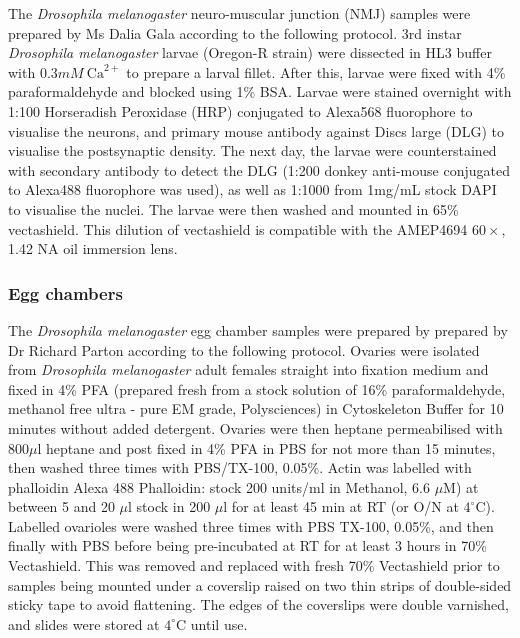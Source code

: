 The \textit{Drosophila melanogaster} neuro-muscular junction (NMJ) 
samples were prepared by Ms Dalia Gala according to the following protocol. 3rd instar \textit{Drosophila melanogaster} larvae (Oregon-R 
strain) were dissected in HL3 buffer with $0.3mM~\text{Ca}^{2+}$ to 
prepare a larval fillet. After this, larvae were fixed with 
4\% paraformaldehyde and blocked using 1\% BSA.\cite{brent2009drosophila} Larvae were stained overnight with 1:100 Horseradish Peroxidase (HRP) 
conjugated to Alexa568 fluorophore to visualise the neurons, and 
primary mouse antibody against Discs large (DLG) to visualise the 
postsynaptic density. The next day, the larvae were counterstained 
with secondary antibody to detect the DLG (1:200 donkey anti-mouse 
conjugated to Alexa488 fluorophore was used), as well as 1:1000 from 1mg/mL 
stock DAPI to visualise the nuclei. The larvae were then washed and mounted 
in 65\% vectashield\cite{brent2009drosophila}. This dilution of 
vectashield is compatible with the AMEP4694 $60\times$, 1.42 NA oil 
immersion lens.

\subsubsection{Egg chambers}
\label{subsubsec:Aurox_Egg_chambers_prep}


The \textit{Drosophila melanogaster} egg chamber samples were prepared by prepared by Dr Richard Parton according to the following protocol. Ovaries were isolated from \textit{Drosophila 
melanogaster} adult females straight into fixation medium and fixed in 4\% PFA 
(prepared fresh from a stock solution of 16\% paraformaldehyde, methanol free 
ultra - pure EM grade, Polysciences) in Cytoskeleton Buffer for 10 minutes 
without added 
detergent\cite{jia2016automatic,zhang2020nanoscale,leyton2016pfa}.  Ovaries 
were then heptane permeabilised with 800$\mu$l heptane and post fixed in 4\% 
PFA in PBS for not more than 15 minutes, then washed three times with 
PBS/TX-100, 0.05\%. Actin was labelled with phalloidin Alexa 488 Phalloidin: 
stock 200 units/ml in Methanol, 6.6 $\mu$M) at between 5 and 20 $\mu$l stock 
in 200 $\mu$l for at least 45 min at RT (or O/N at $4^{\circ}$C). Labelled 
ovarioles were washed three times with PBS TX-100, 0.05\%, and then finally 
with PBS before being pre-incubated at RT for at least 3 hours in 70\% 
Vectashield. This was removed and replaced with fresh 70\% Vectashield prior 
to samples being mounted under a coverslip raised on two thin strips of 
double-sided sticky tape to avoid flattening\cite{davidson2016localized}. The 
edges of the coverslips were double varnished, and slides were stored at 
$4^{\circ}$C until use.

